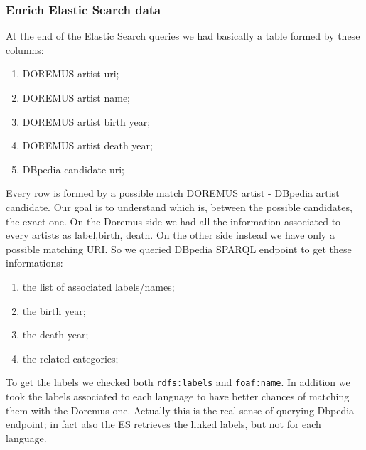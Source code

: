 \documentclass[paper=a4, fontsize=11pt]{scrartcl}
\begin{document}
\subsubsection{Enrich Elastic Search data}

At the end of the Elastic Search queries we had basically a table formed by these columns:

\begin{enumerate}

\item DOREMUS artist uri;

\item DOREMUS artist name;

\item DOREMUS artist birth year;

\item DOREMUS artist death year;

\item DBpedia candidate uri;

\end{enumerate}

Every row is formed by a possible match DOREMUS artist - DBpedia artist candidate. 
Our goal is to understand which is, between the possible candidates, the exact one. 
On the Doremus side we had all the information associated to every artists as label,birth, death. On the other side instead we have only a possible matching URI. So we queried DBpedia SPARQL endpoint to get these informations:

\begin{enumerate}

\item the list of associated labels/names;

\item the birth year;

\item the death year;

\item the related categories;

\end{enumerate}

To get the labels we checked both \verb|rdfs:labels| and \verb|foaf:name|. In addition we took the labels associated to each language to have better chances of matching them with the Doremus one. Actually this is the real sense of querying Dbpedia endpoint; in fact also the ES retrieves the linked labels, but not for each language.
\end{document}

